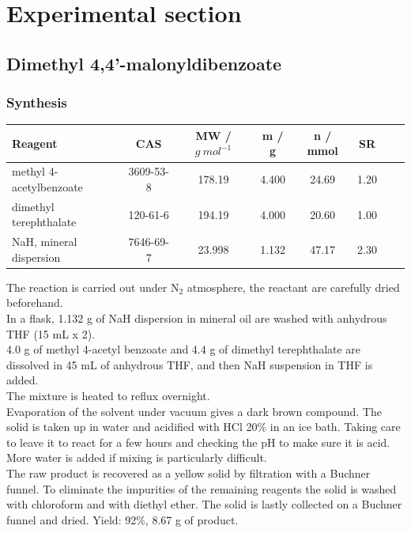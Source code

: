 \documentclass[../Master.tex]{subfiles}
\begin{document}
\chapter{Experimental section}\label{cha:experimental-section}
\section{Dimethyl 4,4'-malonyldibenzoate}
\subsection{Synthesis}

\begin{center}
	\begin{tabular}[b]{lccccccc}
		\toprule
		Reagent                 & CAS       & MW / \(g \ mol^{-1}\) & m / g & n / mmol & SR   \\
		\midrule
		methyl 4-acetylbenzoate & 3609-53-8 & 178.19                & 4.400 & 24.69    & 1.20 \\
		dimethyl terephthalate  & 120-61-6  & 194.19                & 4.000 & 20.60    & 1.00 \\
		NaH, mineral dispersion & 7646-69-7 & 23.998                & 1.132 & 47.17    & 2.30 \\
		\bottomrule
	\end{tabular}
\end{center}

The reaction is carried out under N$_{2}$ atmosphere, the reactant are carefully dried beforehand.\\
In a flask, 1.132 g of NaH dispersion in mineral oil are washed with anhydrous THF (15 mL x 2).\\
4.0 g of methyl 4-acetyl benzoate and 4.4 g of dimethyl terephthalate are dissolved in 45 mL of anhydrous THF, and then NaH suspension in THF is added.\\
The mixture is heated to reflux overnight. \\
Evaporation of the solvent under vacuum gives a dark brown compound. The solid is taken up in water and acidified with HCl 20\% in an ice bath. Taking care to leave it to react for a few hours and checking the pH to make sure it is acid. More water is added if mixing is particularly difficult.\\
The raw product is recovered as a yellow solid by filtration with a Buchner funnel.
To eliminate the impurities of the remaining reagents the solid is washed with chloroform and with diethyl ether. The solid is lastly collected on a Buchner funnel and dried. Yield: 92\%, 8.67 g of product.
\end{document}
